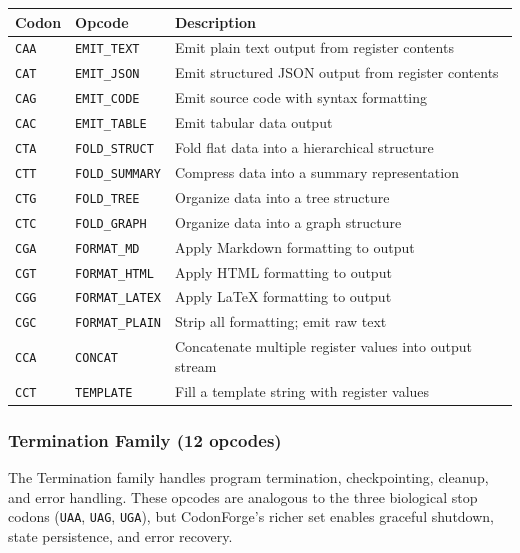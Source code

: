 \begin{center}
\renewcommand{\arraystretch}{1.1}
\small
\begin{tabularx}{0.97\textwidth}{L{1.2cm} L{3cm} Y}
\toprule
\textbf{Codon} & \textbf{Opcode} & \textbf{Description} \\
\midrule
\texttt{CAA} & \texttt{EMIT\_TEXT} & Emit plain text output from register contents \\
\texttt{CAT} & \texttt{EMIT\_JSON} & Emit structured JSON output from register contents \\
\texttt{CAG} & \texttt{EMIT\_CODE} & Emit source code with syntax formatting \\
\texttt{CAC} & \texttt{EMIT\_TABLE} & Emit tabular data output \\
\texttt{CTA} & \texttt{FOLD\_STRUCT} & Fold flat data into a hierarchical structure \\
\texttt{CTT} & \texttt{FOLD\_SUMMARY} & Compress data into a summary representation \\
\texttt{CTG} & \texttt{FOLD\_TREE} & Organize data into a tree structure \\
\texttt{CTC} & \texttt{FOLD\_GRAPH} & Organize data into a graph structure \\
\texttt{CGA} & \texttt{FORMAT\_MD} & Apply Markdown formatting to output \\
\texttt{CGT} & \texttt{FORMAT\_HTML} & Apply HTML formatting to output \\
\texttt{CGG} & \texttt{FORMAT\_LATEX} & Apply \LaTeX{} formatting to output \\
\texttt{CGC} & \texttt{FORMAT\_PLAIN} & Strip all formatting; emit raw text \\
\texttt{CCA} & \texttt{CONCAT} & Concatenate multiple register values into output stream \\
\texttt{CCT} & \texttt{TEMPLATE} & Fill a template string with register values \\
\bottomrule
\end{tabularx}
\end{center}

\subsubsection{Termination Family (12 opcodes)}

The Termination family handles program termination, checkpointing, cleanup, and error handling. These opcodes are analogous to the three biological stop codons (\texttt{UAA}, \texttt{UAG}, \texttt{UGA}), but CodonForge's richer set enables graceful shutdown, state persistence, and error recovery.

